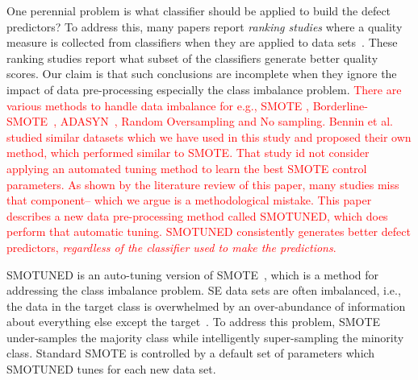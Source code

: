 \documentclass[sigconf,review, anonymous]{acmart}
\theoremstyle{break}
\theoremstyle{break}
\newcommand{\sma}{{\sc SMOTE}}
\newcommand{\smb}{{\sc SMOTUNED}}
\begin{document}
One perennial problem   is what classifier should be applied to build the defect predictors?
To address this, many papers report {\em ranking studies} where
a quality measure  is collected from    classifiers when they are 
 applied to data sets~\cite{lessmann2008benchmarking,hall2012systematic,elish2008predicting,menzies2010defect,gondra2008applying,radjenovic2013software,jiang2008techniques,wang2013using,mende2009revisiting,li2012sample,khoshgoftaar2010attribute,jiang2009variance,ghotra2015revisiting,jiang2008can,tantithamthavorn2016automated,fu2016tuning}.
These ranking studies report what  subset of the classifiers
 generate  better quality scores.
Our claim is that such conclusions are incomplete when
they ignore the impact of  
data pre-processing especially the class imbalance problem. \textcolor{red}{There are various methods to handle data imbalance for e.g., {\sma} \cite{chawla2002smote}, Borderline-SMOTE~\cite{han2005borderline}, ADASYN~\cite{he2008adasyn}, Random Oversampling and No sampling. Bennin et al.~\cite{bennin2017mahakil} studied similar datasets which we have used in this study and   proposed their own method, which performed similar to {\sma}. That  study  id  not consider applying an automated tuning method to learn the best SMOTE control parameters. As shown by the literature review of this paper, many studies
miss that component-- which we  argue is a methodological mistake.
This paper describes a 
new data pre-processing method called {\smb}, which does perform that automatic tuning.
{\smb}  consistently generates better 
defect predictors,
{\em regardless of the classifier used
to make the predictions}. } 

{\smb} is an auto-tuning version of  {\sma}~\cite{chawla2002smote}, which is
a method for addressing the class imbalance problem. SE data
sets are often imbalanced, i.e., the data in the target class is overwhelmed by an over-abundance of information about everything else except the target~\cite{menzies2007problems}. To
address this problem, {\sma} under-samples
the majority class while intelligently super-sampling  the minority class. Standard
{\sma} is controlled by a default
set of parameters which {\smb} tunes 
for each new data set. 
\end{document}
